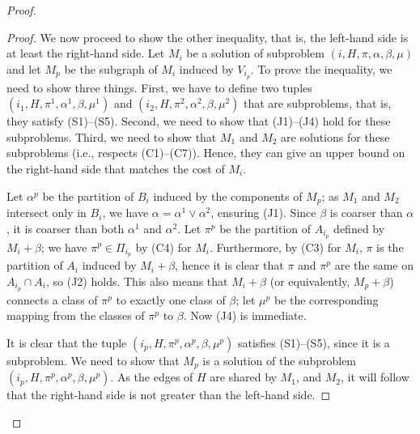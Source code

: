 \begin{proof}
\begin{proof}

We now proceed to show the other inequality, that is, the left-hand side is at least the right-hand side.
Let \(M_i\) be a solution of subproblem \((i, H, \pi, \alpha, \beta, \mu)\) and let \(M_p\) be the subgraph of \(M_i\) induced by \(V_{i_p}\). To prove the inequality, we need to show three things. First, we have to define two tuples \((i_1, H, \pi^1, \alpha^1,\beta,\mu^1)\) and \((i_2, H, \pi^2, \alpha^2,\beta,\mu^2)\) that are subproblems, that is, they satisfy (S1)–(S5). Second, we need to show that (J1)–(J4) hold for these subproblems. Third, we need to show that \(M_1\) and \(M_2\) are solutions for these subproblems (i.e., respects (C1)–(C7)). Hence, they can give an upper bound on the right-hand side that matches the cost of \(M_i\).

Let \(\alpha^p\) be the partition of \(B_i\) induced by the components of \(M_p\); as \(M_1\) and \(M_2\) intersect only in \(B_i\), we have \(\alpha = \alpha^1 \vee \alpha^2\), ensuring (J1). Since \(\beta\) is coarser than \(\alpha\), it is coarser than both \(\alpha^1\) and \(\alpha^2\). Let \(\pi^p\) be the partition of \(A_{i_p}\) defined by \(M_i + \beta\); we have \(\pi^p \in \Pi_{i_p}\) by (C4) for \(M_i\). Furthermore, by (C3) for \(M_i\), \(\pi\) is the partition of \(A_i\) induced by \(M_i + \beta\), hence it is clear that \(\pi\) and \(\pi^p\) are the same on \(A_{i_p} \cap A_i\), so (J2) holds. This also means that \(M_i + \beta\) (or equivalently, \(M_p + \beta\)) connects a class of \(\pi^p\) to exactly one class of \(\beta\); let \(\mu^p\) be the corresponding mapping from the classes of \(\pi^p\) to \(\beta\). Now (J4) is immediate.

It is clear that the tuple \((i_p, H, \pi^p, \alpha^p, \beta, \mu^p)\) satisfies (S1)–(S5), since it is a subproblem. We need to show that \(M_p\) is a solution of the subproblem \((i_p, H, \pi^p, \alpha^p, \beta, \mu^p)\). As the edges of \(H\) are shared by \(M_1\), and \(M_2\), it will follow that the right-hand side is not greater than the left-hand side.


\end{proof}
\end{proof}
